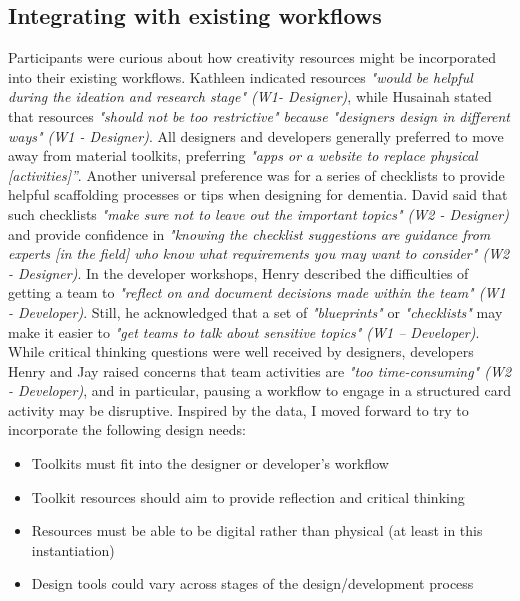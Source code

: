 \subsection{Integrating with existing workflows}
Participants were curious about how creativity resources might be incorporated into their existing workflows. Kathleen indicated resources \textit{"would be helpful during the ideation and research stage" (W1- Designer)}, while Husainah stated that resources \textit{"should not be too restrictive" because "designers design in different ways" (W1 - Designer)}. All designers and developers generally preferred to move away from material toolkits, preferring \textit{"apps or a website to replace physical [activities]”}. 
Another universal preference was for a series of checklists to provide helpful scaffolding processes or tips when designing for dementia. David said that such checklists \textit{"make sure not to leave out the important topics" (W2 - Designer)} and provide confidence in \textit{"knowing the checklist suggestions are guidance from experts [in the field] who know what requirements you may want to consider" (W2 - Designer)}. In the developer workshops, Henry described the difficulties of getting a team to \textit{"reflect on and document decisions made within the team" (W1 - Developer)}. Still, he acknowledged that a set of \textit{"blueprints"} or \textit{"checklists"} may make it easier to \textit{"get teams to talk about sensitive topics" (W1 – Developer)}. 
While critical thinking questions were well received by designers, developers Henry and Jay raised concerns that team activities are \textit{"too time-consuming" (W2 - Developer)}, and in particular, pausing a workflow to engage in a structured card activity may be disruptive. Inspired by the data, I moved forward to try to incorporate the following design needs:
\begin{itemize}
\item Toolkits must fit into the designer or developer’s workflow	
\item Toolkit resources should aim to provide reflection and critical thinking
\item Resources must be able to be digital rather than physical (at least in this instantiation)
\item Design tools could vary across stages of the design/development process 
\end{itemize}


